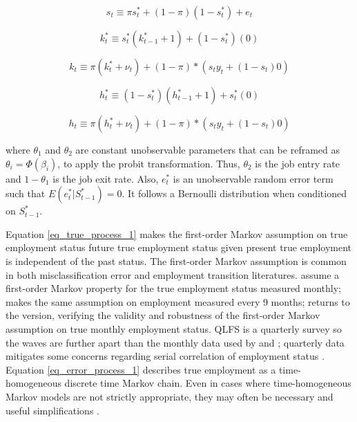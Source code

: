 \documentclass[letterpaper,12pt,final,dvipsnames]{article}
\begin{document}
\begin{equation} 
s_t \equiv \pi s_t^* + (1-\pi)(1-s_t^*)+e_t
\end{equation}


\begin{equation} 
 k^*_t \equiv s_t^*(k^*_{t-1} + 1) + (1 - s_t^*)(0) 
\end{equation}



\begin{equation} 
 k_t \equiv \pi (k_t^* + \nu_t) + (1-\pi)*(s_t y_t + (1-s_t)0)
\end{equation}



\begin{equation} 
 h^*_t \equiv (1-s_t^*)(h^*_{t-1} + 1) +  s_t^*(0) 
\end{equation}

\begin{equation} 
 h_t \equiv \pi (h_t^* + \nu_t) + (1-\pi)*(s_t y_t + (1-s_t)0)
\end{equation}










where $\theta_1$ and $\theta_2$ are constant unobservable parameters that can be reframed as $\theta_i = \Phi(\beta_{i})$, to apply the probit transformation. Thus, $\theta_2$ is the job entry rate and $1-\theta_1$ is the job exit rate. Also, $e_t^*$ is an unobservable random error term such that $E(e_t^*|S_{t-1}^*)=0$. It follows a Bernoulli distribution when conditioned on $S_{t-1}^*$.

Equation \ref{eq_true_process_1} makes the first-order Markov assumption on true employment status \textemdash future true employment status given present true employment is independent of the past status. The first-order Markov assumption is common in both misclassification error and employment transition literatures. \cite{biemer2000} assume a first-order Markov property for the true employment status measured monthly; \cite{feng2013} makes the same assumption on employment measured every 9 months; \cite{shibata2019} returns to the \cite{biemer2000} version, verifying the validity and robustness of the first-order Markov assumption on true monthly employment status. QLFS is a quarterly survey so the waves are further apart than the monthly data used by \cite{biemer2000} and \cite{shibata2019}; quarterly data mitigates some concerns regarding serial correlation of employment status \citep{shibata2019}. Equation \ref{eq_error_process_1} describes true employment as a time-homogeneous discrete time Markov chain. Even in cases where time-homogeneous Markov models are not strictly appropriate, they may often be necessary and useful simplifications \citep{kalbfleisch1985}.
\end{document}

